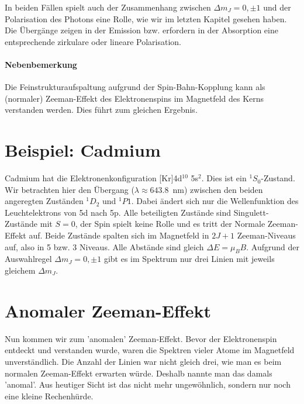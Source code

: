 In beiden Fällen spielt auch der Zusammenhang zwischen $\Delta m_J = 0, \pm1$ und der Polarisation des Photons eine Rolle, wie wir im letzten Kapitel gesehen haben. Die Übergänge zeigen in der Emission bzw. erfordern in der Absorption eine entsprechende zirkulare oder lineare Polarisation.


\paragraph{Nebenbemerkung} Die Feinstrukturaufspaltung aufgrund der Spin-Bahn-Kopplung kann als (normaler) Zeeman-Effekt des Elektronenspins im Magnetfeld des Kerns verstanden werden. Dies führt zum gleichen Ergebnis.

\section{Beispiel: Cadmium}

Cadmium hat die Elektronenkonfiguration [Kr]4d$^{10}$ 5s$^2$. Dies ist ein $^1S_0$-Zustand. Wir betrachten hier den Übergang ($\lambda \approx 643.8$~nm) zwischen den beiden angeregten Zuständen $^1D_2$ und $^1P1$. Dabei ändert sich nur die Wellenfunktion des Leuchtelektrons von 5d nach 5p. Alle beteiligten Zustände sind Singulett-Zustände mit $S=0$, der Spin spielt keine Rolle und es tritt der Normale Zeeman-Effekt auf. Beide Zustände spalten sich im Magnetfeld in $2J+1$ Zeeman-Niveaus auf, also in 5 bzw. 3 Niveaus. Alle Abstände sind gleich $\Delta E = \mu_B B$. Aufgrund der Auswahlregel $\Delta m_J = 0, \pm1$ gibt es im Spektrum nur drei Linien mit jeweils gleichem $\Delta m_J$.

\begin{marginfigure} 
    \caption{Normaler Zeeman-Effekt in .}
\end{marginfigure}


\section{Anomaler Zeeman-Effekt}

Nun kommen wir zum 'anomalen' Zeeman-Effekt. Bevor der Elektronenspin entdeckt und verstanden wurde, waren die Spektren vieler Atome im Magnetfeld unverständlich. Die Anzahl der Linien war nicht gleich drei, wie man es beim normalen Zeeman-Effekt erwarten würde. Deshalb nannte man das damals 'anomal'. Aus heutiger Sicht ist das nicht mehr ungewöhnlich, sondern nur noch eine kleine Rechenhürde.

